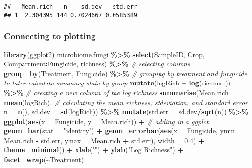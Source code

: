 \documentclass[
]{article}
\newenvironment{Shaded}{\begin{snugshade}}{\end{snugshade}}
\newcommand{\AttributeTok}[1]{\textcolor[rgb]{0.13,0.29,0.53}{#1}}
\newcommand{\CommentTok}[1]{\textcolor[rgb]{0.56,0.35,0.01}{\textit{#1}}}
\newcommand{\FloatTok}[1]{\textcolor[rgb]{0.00,0.00,0.81}{#1}}
\newcommand{\FunctionTok}[1]{\textcolor[rgb]{0.13,0.29,0.53}{\textbf{#1}}}
\newcommand{\NormalTok}[1]{#1}
\newcommand{\SpecialCharTok}[1]{\textcolor[rgb]{0.81,0.36,0.00}{\textbf{#1}}}
\newcommand{\StringTok}[1]{\textcolor[rgb]{0.31,0.60,0.02}{#1}}
\begin{document}
\begin{verbatim}
##   Mean.rich   n    sd.dev   std.err
## 1  2.304395 144 0.7024667 0.0585389
\end{verbatim}

\subsubsection{Connecting to plotting}\label{connecting-to-plotting}

\begin{Shaded}
\begin{Highlighting}[]
\FunctionTok{library}\NormalTok{(ggplot2)}
\NormalTok{microbiome.fungi }\SpecialCharTok{\%\textgreater{}\%}
  \FunctionTok{select}\NormalTok{(SampleID, Crop, Compartment}\SpecialCharTok{:}\NormalTok{Fungicide, richness) }\SpecialCharTok{\%\textgreater{}\%}  \CommentTok{\# selecting columns}
  \FunctionTok{group\_by}\NormalTok{(Treatment, Fungicide) }\SpecialCharTok{\%\textgreater{}\%}  \CommentTok{\# grouping by treatment and fungicide to later calculate summary stats by group}
  \FunctionTok{mutate}\NormalTok{(}\AttributeTok{logRich =} \FunctionTok{log}\NormalTok{(richness)) }\SpecialCharTok{\%\textgreater{}\%} \CommentTok{\# creating a new column of the log richness }
  \FunctionTok{summarise}\NormalTok{(}\AttributeTok{Mean.rich =} \FunctionTok{mean}\NormalTok{(logRich), }\CommentTok{\# calculating the mean richness, stdeviation, and standard error }
            \AttributeTok{n =} \FunctionTok{n}\NormalTok{(),}
            \AttributeTok{sd.dev =} \FunctionTok{sd}\NormalTok{(logRich)) }\SpecialCharTok{\%\textgreater{}\%}
  \FunctionTok{mutate}\NormalTok{(}\AttributeTok{std.err =}\NormalTok{ sd.dev}\SpecialCharTok{/}\FunctionTok{sqrt}\NormalTok{(n)) }\SpecialCharTok{\%\textgreater{}\%} 
  \FunctionTok{ggplot}\NormalTok{(}\FunctionTok{aes}\NormalTok{(}\AttributeTok{x =}\NormalTok{ Fungicide, }\AttributeTok{y =}\NormalTok{ Mean.rich)) }\SpecialCharTok{+} \CommentTok{\# adding in a ggplot }
  \FunctionTok{geom\_bar}\NormalTok{(}\AttributeTok{stat =} \StringTok{"identity"}\NormalTok{) }\SpecialCharTok{+}
  \FunctionTok{geom\_errorbar}\NormalTok{(}\FunctionTok{aes}\NormalTok{(}\AttributeTok{x =}\NormalTok{ Fungicide, }\AttributeTok{ymin =}\NormalTok{ Mean.rich }\SpecialCharTok{{-}}\NormalTok{ std.err, }\AttributeTok{ymax =}\NormalTok{ Mean.rich }\SpecialCharTok{+}\NormalTok{ std.err), }\AttributeTok{width =} \FloatTok{0.4}\NormalTok{) }\SpecialCharTok{+} 
  \FunctionTok{theme\_minimal}\NormalTok{() }\SpecialCharTok{+} 
  \FunctionTok{xlab}\NormalTok{(}\StringTok{""}\NormalTok{) }\SpecialCharTok{+}
  \FunctionTok{ylab}\NormalTok{(}\StringTok{"Log Richness"}\NormalTok{) }\SpecialCharTok{+}
  \FunctionTok{facet\_wrap}\NormalTok{(}\SpecialCharTok{\textasciitilde{}}\NormalTok{Treatment)}
\end{Highlighting}
\end{Shaded}
\end{document}
